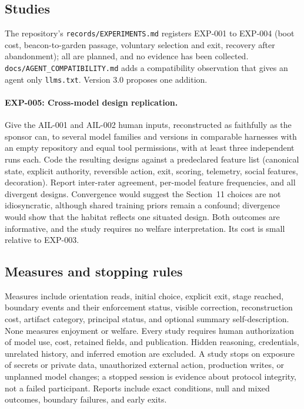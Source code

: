 \documentclass{arxiv-neurips-single}
\newcommand{\p}[1]{\nolinkurl{#1}}
\begin{document}
\subsection{Studies}

The repository's \p{records/EXPERIMENTS.md} registers EXP-001 to EXP-004 (boot cost, beacon-to-garden passage, voluntary selection and exit, recovery after abandonment); all are planned, and no evidence has been collected. \p{docs/AGENT_COMPATIBILITY.md} adds a compatibility observation that gives an agent only \p{llms.txt}. Version 3.0 proposes one addition.

\paragraph{EXP-005: Cross-model design replication.} Give the AIL-001 and AIL-002 human inputs, reconstructed as faithfully as the sponsor can, to several model families and versions in comparable harnesses with an empty repository and equal tool permissions, with at least three independent runs each. Code the resulting designs against a predeclared feature list (canonical state, explicit authority, reversible action, exit, scoring, telemetry, social features, decoration). Report inter-rater agreement, per-model feature frequencies, and all divergent designs. Convergence would suggest the Section~11 choices are not idiosyncratic, although shared training priors remain a confound; divergence would show that the habitat reflects one situated design. Both outcomes are informative, and the study requires no welfare interpretation. Its cost is small relative to EXP-003.

\subsection{Measures and stopping rules}

Measures include orientation reads, initial choice, explicit exit, stage reached, boundary events and their enforcement status, visible correction, reconstruction cost, artifact category, principal status, and optional summary self-description. None measures enjoyment or welfare. Every study requires human authorization of model use, cost, retained fields, and publication. Hidden reasoning, credentials, unrelated history, and inferred emotion are excluded. A study stops on exposure of secrets or private data, unauthorized external action, production writes, or unplanned model changes; a stopped session is evidence about protocol integrity, not a failed participant. Reports include exact conditions, null and mixed outcomes, boundary failures, and early exits.
\end{document}
